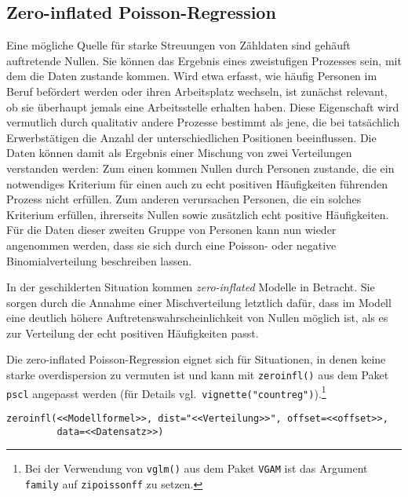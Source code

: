 \subsection{Zero-inflated Poisson-Regression}

Eine mögliche Quelle für starke Streuungen von Zähldaten sind gehäuft auftretende Nullen. Sie können das Ergebnis eines zweistufigen Prozesses sein, mit dem die Daten zustande kommen. Wird etwa erfasst, wie häufig Personen im Beruf befördert werden oder ihren Arbeitsplatz wechseln, ist zunächst relevant, ob sie überhaupt jemals eine Arbeitsstelle erhalten haben. Diese Eigenschaft wird vermutlich durch qualitativ andere Prozesse bestimmt als jene, die bei tatsächlich Erwerbstätigen die Anzahl der unterschiedlichen Positionen beeinflussen. Die Daten können damit als Ergebnis einer Mischung von zwei Verteilungen verstanden werden: Zum einen kommen Nullen durch Personen zustande, die ein notwendiges Kriterium für einen auch zu echt positiven Häufigkeiten führenden Prozess nicht erfüllen. Zum anderen verursachen Personen, die ein solches Kriterium erfüllen, ihrerseits Nullen sowie zusätzlich echt positive Häufigkeiten. Für die Daten dieser zweiten Gruppe von Personen kann nun wieder angenommen werden, dass sie sich durch eine Poisson- oder negative Binomialverteilung beschreiben lassen.

In der geschilderten Situation kommen \emph{zero-inflated} Modelle in Betracht. Sie sorgen durch die Annahme einer Mischverteilung letztlich dafür, dass im Modell eine deutlich höhere Auftretenswahrscheinlichkeit von Nullen möglich ist, als es zur Verteilung der echt positiven Häufigkeiten passt.

Die zero-inflated Poisson-Regression eignet sich für Situationen, in denen keine starke overdispersion zu vermuten ist und kann mit \lstinline!zeroinfl()! aus dem Paket \lstinline!pscl! angepasst werden (für Details vgl.\ \lstinline!vignette("countreg")!).\footnote{Bei der Verwendung von \lstinline!vglm()! aus dem Paket \lstinline!VGAM! ist das Argument \lstinline!family! auf \lstinline!zipoissonff! zu setzen.}
\begin{lstlisting}
zeroinfl(<<Modellformel>>, dist="<<Verteilung>>", offset=<<offset>>,
         data=<<Datensatz>>)
\end{lstlisting}

